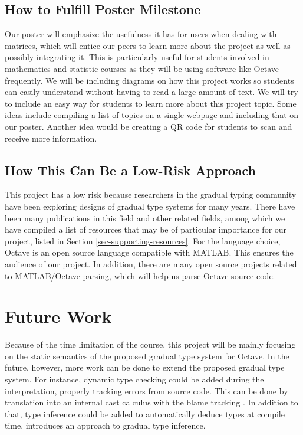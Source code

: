 \subsection{How to Fulfill Poster Milestone}
Our poster will emphasize the usefulness it has for users when dealing with
matrices, which will entice our peers to learn more about the project as well as
possibly integrating it. This is particularly useful for students involved in
mathematics and statistic courses as they will be using software like Octave
frequently. We will be including diagrams on how this project works so students
can easily understand without having to read a large amount of text. We will try
to include an easy way for students to learn more about this project topic. Some
ideas include compiling a list of topics on a single webpage and including that
on our poster. Another idea would be creating a QR code for students to scan and
receive more information.

\subsection{How This Can Be a Low-Risk Approach}
This project has a low risk because researchers in the gradual typing community
have been exploring designs of gradual type systems for many years. There have
been many publications in this field and other related fields, among which we
have compiled a list of resources that may be of particular importance for our
project, listed in Section \ref{sec-supporting-resources}. For the language
choice, Octave is an open source language compatible with MATLAB. This ensures
the audience of our project. In addition, there are many open source projects
related to MATLAB/Octave parsing, which will help us parse Octave source code.

\section{Future Work}
\label{sec-future-work}
Because of the time limitation of the course, this project will be mainly
focusing on the static semantics of the proposed gradual type system for Octave.
In the future, however, more work can be done to extend the proposed gradual
type system. For instance, dynamic type checking could be added during the
interpretation, properly tracking errors from source code. This can be done by
translation into an internal cast calculus with the blame tracking
\cite{siek2015refined}. In addition to that, type inference could be added to
automatically deduce types at compile time. \cite{garcia2015principal}
introduces an approach to gradual type inference.

